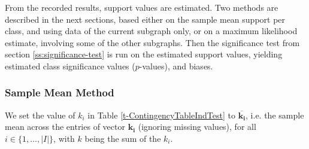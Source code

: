 \documentclass{sig-alternate}
\begin{document}
From the recorded results, support values are estimated. Two methods are described in the next sections, based either
on the sample mean support per class, and using data of the current subgraph
only, or on a maximum likelihood estimate, involving some of the other
subgraphs. Then the significance test from section \ref{ss:significance-test}
is run on the estimated support values, yielding estimated class significance values ($p$-values), 
and biases.

\subsubsection{Sample Mean Method}
\label{ss:simple-mean}
We set the value of $k_i$ in Table \ref{t-ContingencyTableIndTest} to
$\overline{\mathbf{k_i}}$, i.e. the sample mean
across the entries of vector $\mathbf{k_i}$ (ignoring missing values), for all $i \in \{1,\ldots,|I|\}$,
with $k$ being the sum of the $k_i$.
\end{document}
